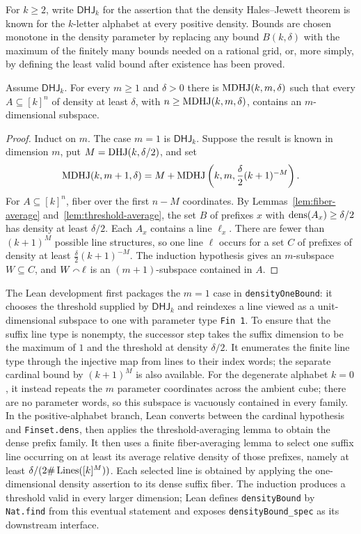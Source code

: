 For $k\geq2$, write $\mathsf{DHJ}_k$ for the assertion that the density Hales--Jewett theorem is
known for the $k$-letter alphabet at every positive density.  Bounds are chosen monotone in the
density parameter by replacing any bound $B(k,\delta)$ with the maximum of the finitely many bounds
needed on a rational grid, or, more simply, by defining the least valid bound after existence has
been proved.

\begin{proposition}
\label{prop:mdhj}
Assume $\mathsf{DHJ}_k$.  For every $m\geq1$ and $\delta>0$ there is
$\operatorname{MDHJ}(k,m,\delta)$ such that every $A\subseteq[k]^n$ of density at least $\delta$, with
$n\geq\operatorname{MDHJ}(k,m,\delta)$, contains an $m$-dimensional subspace.
\end{proposition}

\begin{proof}
Induct on $m$.  The case $m=1$ is $\mathsf{DHJ}_k$.  Suppose the result is known in dimension
$m$, put $M=\operatorname{DHJ}(k,\delta/2)$, and set
\[
 \operatorname{MDHJ}(k,m+1,\delta)
 =M+\operatorname{MDHJ}\left(k,m,\frac{\delta}{2}(k+1)^{-M}\right).
\]
For $A\subseteq[k]^n$, fiber over the first $n-M$ coordinates.  By
Lemmas~\ref{lem:fiber-average} and~\ref{lem:threshold-average}, the set $B$ of prefixes $x$ with
$\operatorname{dens}(A_x)\geq\delta/2$ has density at least $\delta/2$.  Each $A_x$ contains a line $\ell_x$.
There are fewer than $(k+1)^M$ possible line structures, so one line $\ell$ occurs for a set $C$
of prefixes of density at least $\frac\delta2(k+1)^{-M}$.  The induction hypothesis gives an
$m$-subspace $W\subseteq C$, and $W\mathbin{\smallfrown}\ell$ is an $(m+1)$-subspace contained in $A$.
\end{proof}

The Lean development first packages the $m=1$ case in
\texttt{densityOneBound}: it chooses the threshold supplied by $\mathsf{DHJ}_k$ and reindexes a
line viewed as a unit-dimensional subspace to one with parameter type \texttt{Fin 1}.  To ensure
that the suffix line type is nonempty, the successor step takes the suffix dimension to be the
maximum of $1$ and the threshold at density $\delta/2$.  It enumerates the finite line type through
the injective map from lines to their index words; the separate cardinal bound by
$(k+1)^M$ is also available.
For the degenerate alphabet $k=0$, it instead repeats the $m$ parameter coordinates across the
ambient cube; there are no parameter words, so this subspace is vacuously contained in every
family.  In the positive-alphabet branch, Lean converts between the cardinal hypothesis and
\texttt{Finset.dens}, then applies the threshold-averaging lemma to obtain the dense prefix family.
It then uses a finite fiber-averaging lemma to select one suffix line occurring on at least its
average relative density of those prefixes, namely at least $\delta/(2\#\operatorname{Lines}([k]^M))$.
Each selected line is obtained by applying the one-dimensional density assertion to its dense
suffix fiber.  The induction produces a threshold valid in every larger dimension; Lean defines
\texttt{densityBound} by \texttt{Nat.find} from this eventual statement and exposes
\texttt{densityBound\_spec} as its downstream interface.

